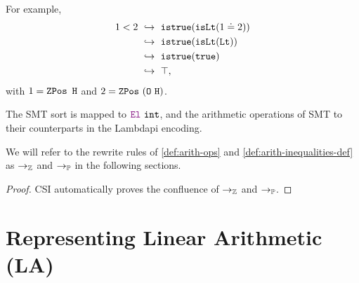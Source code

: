 \begin{example}
For example,
\begin{align*}
  1 < 2
  &\ \hookrightarrow\ \texttt{istrue}(\texttt{isLt}(1 \doteq 2)) \\
  &\ \hookrightarrow\ \texttt{istrue}(\texttt{isLt}(\texttt{Lt})) \\
  &\ \hookrightarrow\ \texttt{istrue}(\texttt{true}) \\
  &\ \hookrightarrow\ \top,
\end{align*}
with $1 = \mathop{\texttt{ZPos}}~\texttt{H}$ and $2 = \mathop{\texttt{ZPos}}~(\texttt{O}~\texttt{H})$.
\end{example}

The SMT sort  is mapped to $\el~\texttt{int}$, and the arithmetic operations of SMT to their counterparts in the Lambdapi encoding.

\begin{notation}
We will refer to the rewrite rules of \cref{def:arith-ops} and \cref{def:arith-inequalities-def} as $\rightarrow_{\mathbb{Z}}$ and $\rightarrow_\mathbb{P}$ in the following sections.
\end{notation}

\begin{lemma}
\begin{proof}
CSI \cite{CSI} automatically proves the confluence of $\rightarrow_\mathbb{Z}$ and $\rightarrow_\mathbb{P}$.
\end{proof}
\label{lemma:confluenceZP}
\end{lemma}

\section{Representing Linear Arithmetic (\uppercase{\textbf{LA})}}
\label{ssec:encoding-la}

